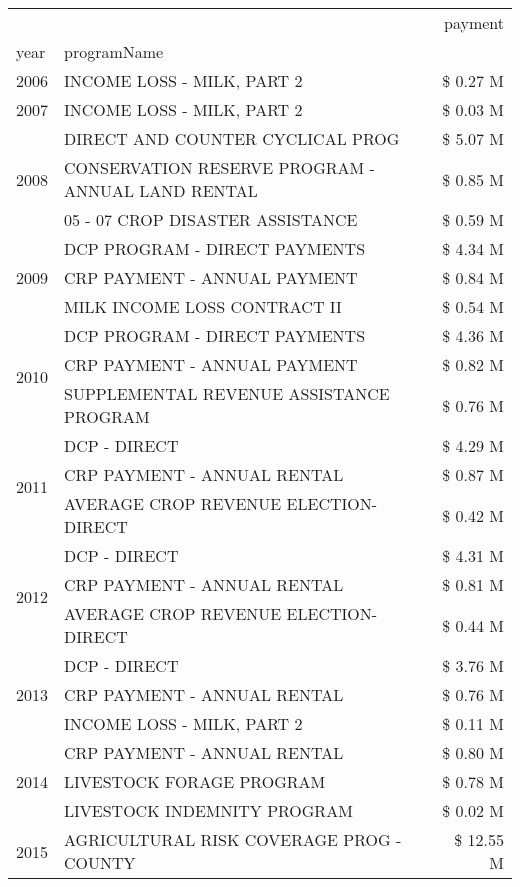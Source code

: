 \begin{tabular}{llr}
\toprule
 &  & payment \\
year & programName &  \\
\midrule
2006 & INCOME LOSS - MILK, PART 2 & \$ 0.27 M \\
\cline{1-3}
2007 & INCOME LOSS - MILK, PART 2 & \$ 0.03 M \\
\cline{1-3}
\multirow[t]{3}{*}{2008} & DIRECT AND COUNTER CYCLICAL PROG & \$ 5.07 M \\
 & CONSERVATION RESERVE PROGRAM - ANNUAL LAND RENTAL & \$ 0.85 M \\
 & 05 - 07 CROP DISASTER ASSISTANCE & \$ 0.59 M \\
\cline{1-3}
\multirow[t]{3}{*}{2009} & DCP PROGRAM - DIRECT PAYMENTS & \$ 4.34 M \\
 & CRP PAYMENT - ANNUAL PAYMENT & \$ 0.84 M \\
 & MILK INCOME LOSS CONTRACT II & \$ 0.54 M \\
\cline{1-3}
\multirow[t]{3}{*}{2010} & DCP PROGRAM - DIRECT PAYMENTS & \$ 4.36 M \\
 & CRP PAYMENT - ANNUAL PAYMENT & \$ 0.82 M \\
 & SUPPLEMENTAL REVENUE ASSISTANCE PROGRAM & \$ 0.76 M \\
\cline{1-3}
\multirow[t]{3}{*}{2011} & DCP - DIRECT & \$ 4.29 M \\
 & CRP PAYMENT - ANNUAL RENTAL & \$ 0.87 M \\
 & AVERAGE CROP REVENUE ELECTION-DIRECT & \$ 0.42 M \\
\cline{1-3}
\multirow[t]{3}{*}{2012} & DCP - DIRECT & \$ 4.31 M \\
 & CRP PAYMENT - ANNUAL RENTAL & \$ 0.81 M \\
 & AVERAGE CROP REVENUE ELECTION-DIRECT & \$ 0.44 M \\
\cline{1-3}
\multirow[t]{3}{*}{2013} & DCP - DIRECT & \$ 3.76 M \\
 & CRP PAYMENT - ANNUAL RENTAL & \$ 0.76 M \\
 & INCOME LOSS - MILK, PART 2 & \$ 0.11 M \\
\cline{1-3}
\multirow[t]{3}{*}{2014} & CRP PAYMENT - ANNUAL RENTAL & \$ 0.80 M \\
 & LIVESTOCK FORAGE PROGRAM & \$ 0.78 M \\
 & LIVESTOCK INDEMNITY PROGRAM & \$ 0.02 M \\
\cline{1-3}
\multirow[t]{3}{*}{2015} & AGRICULTURAL RISK COVERAGE PROG - COUNTY & \$ 12.55 M \\

\end{tabular}

